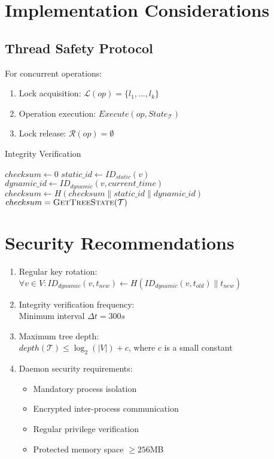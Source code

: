 \documentclass[12pt]{article}
\theoremstyle{definition}
\theoremstyle{remark}
\begin{document}
\section{Implementation Considerations}

\subsection{Thread Safety Protocol}
For concurrent operations:
\begin{enumerate}
    \item Lock acquisition: $\mathcal{L}(op) = \{l_1, ..., l_k\}$
    \item Operation execution: $Execute(op, State_{\mathcal{T}})$
    \item Lock release: $\mathcal{R}(op) = \emptyset$
\end{enumerate}

\begin{algorithm}
\caption{Integrity Verification}
\begin{algorithmic}[1]
    \State $checksum \gets 0$
        \State $static\_id \gets ID_{static}(v)$
        \State $dynamic\_id \gets ID_{dynamic}(v, current\_time)$
        \State $checksum \gets H(checksum \parallel static\_id \parallel dynamic\_id)$
    \EndFor
    \State \Return $checksum = \textsc{GetTreeState}(\mathcal{T})$
\EndProcedure
\end{algorithmic}
\end{algorithm}

\section{Security Recommendations}

\begin{enumerate}
\item Regular key rotation:\\
$\forall v \in V: ID_{dynamic}(v, t_{new}) \leftarrow H(ID_{dynamic}(v, t_{old}) \parallel t_{new})$

\item Integrity verification frequency:\\
Minimum interval $\Delta t = 300s$

\item Maximum tree depth:\\
$depth(\mathcal{T}) \leq \log_2(|V|) + c$, where $c$ is a small constant

\item Daemon security requirements:
\begin{itemize}
    \item Mandatory process isolation
    \item Encrypted inter-process communication
    \item Regular privilege verification
    \item Protected memory space $\geq 256$MB
\end{itemize}
\end{enumerate}
\end{document}
